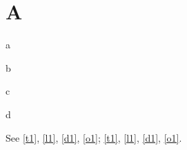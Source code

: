 \documentclass[envcountsame]{llncs}
\begin{document}
\section{A}
\begin{theorem}\label{t1}a\end{theorem}
\begin{lemma}\label{l1}b\end{lemma}
\begin{definition}\label{d1}c\end{definition}
\begin{obs}\label{o1}d\end{obs}
See \ref{t1}, \ref{l1}, \ref{d1}, \ref{o1}; \autoref{t1}, \autoref{l1}, \autoref{d1}, \autoref{o1}.
\end{document}
